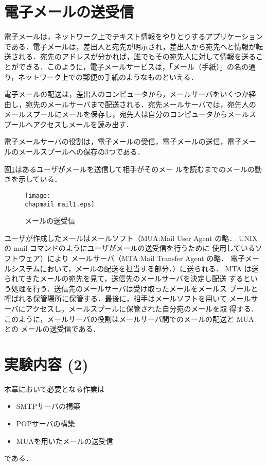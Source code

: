 \section{電子メールの送受信}
電子メールは，ネットワーク上でテキスト情報をやりとりするアプリケーション
である．電子メールは，差出人と宛先が明示され，差出人から宛先へと情報が転
送される．宛先のアドレスが分かれば，誰でもその宛先人に対して情報を送るこ
とができる．このように，電子メールサービスは，「メール（手紙）」の名の通
り，ネットワーク上での郵便の手紙のようなものといえる．

電子メールの配送は，差出人のコンピュータから，メールサーバをいくつか経
由し，宛先のメールサーバまで配送される．宛先メールサーバでは，宛先人の
メールスプールにメールを保存し，宛先人は自分のコンピュータからメールス
プールへアクセスしメールを読み出す．

電子メールサーバの役割は，電子メールの受信，電子メールの送信，電子メー
ルのメールスプールへの保存の3つである．

図\ref{fig:07:maildeliver}はあるユーザがメールを送信して相手がそのメー
ルを読むまでのメールの動きを示している．

 \begin{figure}[hbt]
  \begin{center}
   \texttt{[image: \\chapmail mail1.eps]}   
   \caption{メールの送受信}
   \label{fig:07:maildeliver}
  \end{center}
 \end{figure}

ユーザが作成したメールはメールソフト（MUA:Mail User Agent の略．
UNIX の mail コマンドのようにユーザがメールの送受信を行うために
使用しているソフトウェア）により
メールサーバ（MTA:Mail Transfer Agent の略．
電子メールシステムにおいて，メールの配送を担当する部分．）に送られる．
MTA は送られてきたメールの宛先を見て，送信先のメールサーバを決定し配送
するという処理を行う．送信先のメールサーバは受け取ったメールをメールス
プールと呼ばれる保管場所に保管する．最後に，相手はメールソフトを用いて
メールサーバにアクセスし，メールスプールに保管された自分宛のメールを取
得する．
このように，メールサーバの役割はメールサーバ間でのメールの配送と MUA との
メールの送受信である．

\section{実験内容 (2)}
本章において必要となる作業は
\begin{itemize}
\item SMTPサーバの構築
\item POPサーバの構築
\item MUAを用いたメールの送受信
\end{itemize}
である．

